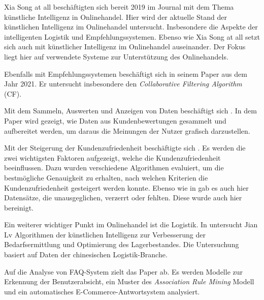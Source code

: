 Xia Song at all beschäftigten sich bereit 2019 im Journal \cite{Song_2019} mit dem Thema künstliche Intelligenz in Onlinehandel. Hier wird der aktuelle Stand der künstlichen Intelligenz im Onlinehandel untersucht. Insbesondere die Aspekte der intelligenten Logistik und Empfehlungssystemen. Ebenso wie Xia Song at all setzt sich auch \cite{Soni_2020} mit künstlicher Intelligenz im Onlinehandel auseinander. Der Fokus liegt hier auf verwendete Systeme zur Unterstützung des Onlinehandels.\vspace{0.2cm}

Ebenfalls mit Empfehlungssystemen beschäftigt sich \cite{Abdul_Hussien_2021} in seinem Paper aus dem Jahr 2021. Er untersucht insbesondere den \textit{Collaborative Filtering Algorithm} (CF).\vspace{0.2cm}

Mit dem Sammeln, Auswerten und Anzeigen von Daten beschäftigt sich \cite{Keerthana_2021}. In dem Paper wird gezeigt, wie Daten aus Kundenbewertungen gesammelt und aufbereitet werden, um daraus die Meinungen der Nutzer grafisch darzustellen.\vspace{0.2cm}

Mit der Steigerung der Kundenzufriedenheit beschäftigte sich \cite{Wong_2020}. Es werden die zwei wichtigsten Faktoren aufgezeigt, welche die Kundenzufriedenheit beeinflussen. Dazu wurden verschiedene Algorithmen evaluiert, um die bestmögliche Genauigkeit zu erhalten, nach welchen Kriterien die Kundenzufriedenheit gesteigert werden konnte. Ebenso wie in \cite{Keerthana_2021} gab es auch hier Datensätze, die unausgeglichen, verzerrt oder fehlten. Diese wurde auch hier bereinigt.\vspace{0.2cm}

Ein weiterer wichtiger Punkt im Onlinehandel ist die Logistik. In \cite{Lv_2021} untersucht Jian Lv Algorithmen der künstlichen Intelligenz zur Verbesserung der Bedarfsermittlung und Optimierung des Lagerbestandes. Die Untersuchung basiert auf Daten der chinesischen Logistik-Branche.\vspace{0.2cm}

Auf die Analyse von FAQ-System zielt das Paper \cite{Pan_2018} ab. Es werden Modelle zur Erkennung der Benutzerabsicht, ein Muster des \textit{Association Rule Mining} Modell und ein automatisches E-Commerce-Antwortsystem analysiert.
